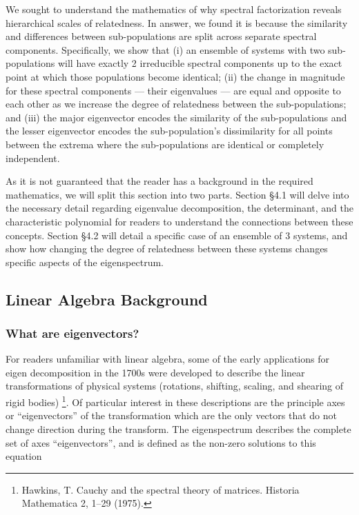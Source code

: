 \documentclass[
  letterpaper,
  DIV=11,
  numbers=noendperiod]{scrartcl}
\begin{document}
We sought to understand the mathematics of why spectral factorization
reveals hierarchical scales of relatedness. In answer, we found it is
because the similarity and differences between sub-populations are split
across separate spectral components. Specifically, we show that (i) an
ensemble of systems with two sub-populations will have exactly 2
irreducible spectral components up to the exact point at which those
populations become identical; (ii) the change in magnitude for these
spectral components --- their eigenvalues --- are equal and opposite to
each other as we increase the degree of relatedness between the
sub-populations; and (iii) the major eigenvector encodes the similarity
of the sub-populations and the lesser eigenvector encodes the
sub-population's dissimilarity for all points between the extrema where
the sub-populations are identical or completely independent.

As it is not guaranteed that the reader has a background in the required
mathematics, we will split this section into two parts. Section §4.1
will delve into the necessary detail regarding eigenvalue decomposition,
the determinant, and the characteristic polynomial for readers to
understand the connections between these concepts. Section §4.2 will
detail a specific case of an ensemble of 3 systems, and show how
changing the degree of relatedness between these systems changes
specific aspects of the eigenspectrum.

\hypertarget{linear-algebra-background}{%
\subsection{Linear Algebra Background}\label{linear-algebra-background}}

\hypertarget{what-are-eigenvectors}{%
\subsubsection{What are eigenvectors?}\label{what-are-eigenvectors}}

For readers unfamiliar with linear algebra, some of the early
applications for eigen decomposition in the 1700s were developed to
describe the linear transformations of physical systems (rotations,
shifting, scaling, and shearing of rigid bodies) \footnote{Hawkins, T.
  Cauchy and the spectral theory of matrices. Historia Mathematica 2,
  1--29 (1975).}. Of particular interest in these descriptions are the
principle axes or ``eigenvectors'' of the transformation which are the
only vectors that do not change direction during the transform. The
eigenspectrum describes the complete set of axes ``eigenvectors'', and
is defined as the non-zero solutions to this equation
\end{document}
